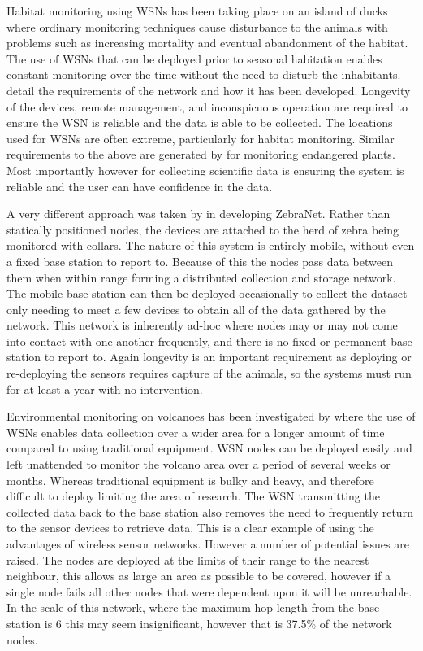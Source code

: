 \documentclass[authoryearcitations]{UoYCSproject}
\begin{document}
Habitat monitoring using WSNs has been taking place on an island of ducks where ordinary monitoring techniques cause disturbance to the animals with problems such as increasing mortality and eventual abandonment of the habitat. The use of WSNs that can be deployed prior to seasonal habitation enables constant monitoring over the time without the need to disturb the inhabitants. \citet{Mainwaring2002} detail the requirements of the network and how it has been developed. Longevity of the devices, remote management, and inconspicuous operation are required to ensure the WSN is reliable and the data is able to be collected. The locations used for WSNs are often extreme, particularly for habitat monitoring. Similar requirements to the above are generated by \citet{Biagioni2002} for monitoring endangered plants. Most importantly however for collecting scientific data is ensuring the system is reliable and the user can have confidence in the data.


A very different approach was taken by \citet{Juang2002} in developing ZebraNet. Rather than statically positioned nodes, the devices are attached to the herd of zebra being monitored with collars. The nature of this system is entirely mobile, without even a fixed base station to report to. Because of this the nodes pass data between them when within range forming a distributed collection and storage network. The mobile base station can then be deployed occasionally to collect the dataset only needing to meet a few devices to obtain all of the data gathered by the network. This network is inherently ad-hoc where nodes may or may not come into contact with one another frequently, and there is no fixed or permanent base station to report to. Again longevity is an important requirement as deploying or re-deploying the sensors requires capture of the animals, so the systems must run for at least a year with no intervention.

Environmental monitoring on volcanoes has been investigated by \citet{Werner-Allen2006} where the use of WSNs enables data collection over a wider area for a longer amount of time compared to using traditional equipment. WSN nodes can be deployed easily and left unattended to monitor the volcano area over a period of several weeks or months. Whereas traditional equipment is bulky and heavy, and therefore difficult to deploy limiting the area of research. The WSN transmitting the collected data back to the base station also removes the need to frequently return to the sensor devices to retrieve data. This is a clear example of using the advantages of wireless sensor networks. However a number of potential issues are raised. The nodes are deployed at the limits of their range to the nearest neighbour, this allows as large an area as possible to be covered, however if a single node fails all other nodes that were dependent upon it will be unreachable. In the scale of this network, where the maximum hop length from the base station is 6 this may seem insignificant, however that is 37.5\% of the network nodes.
\end{document}
